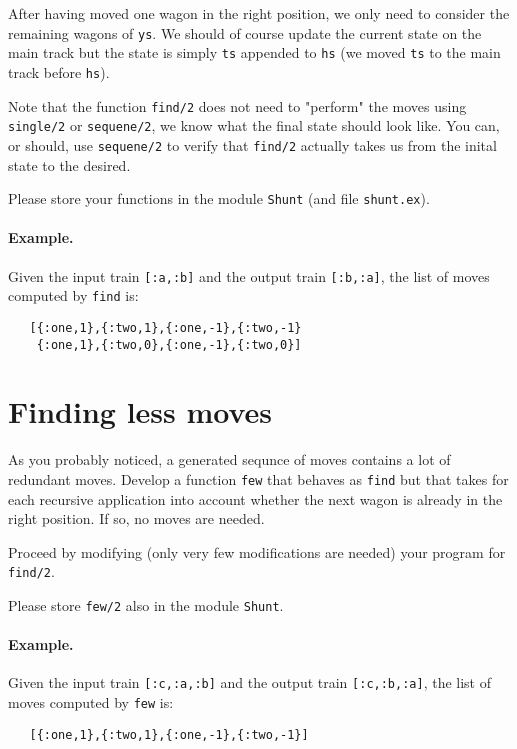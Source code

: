 \documentclass[a4paper,11pt]{article}
\begin{document}
After having moved one wagon in the right position, we only need to
consider the remaining wagons of \verb+ys+. We should of course update
the current state on the main track but the state is simply \verb+ts+
appended to \verb+hs+ (we moved \verb+ts+ to the main track before \verb+hs+).

Note that the function \verb+find/2+ does not need to "perform" the
moves using \verb+single/2+ or \verb+sequene/2+, we know what the
final state should look like. You can, or should, use \verb+sequene/2+
to verify that \verb+find/2+ actually takes us from the inital state
to the desired.

Please store your functions in the module \verb+Shunt+ (and file
\verb+shunt.ex+).

\paragraph{Example.}
Given the input train \verb+[:a,:b]+ and the output train \verb+[:b,:a]+, the
list of moves computed by \verb+find+ is:

\begin{verbatim}
   [{:one,1},{:two,1},{:one,-1},{:two,-1} 
    {:one,1},{:two,0},{:one,-1},{:two,0}]
\end{verbatim}

\section*{Finding less moves}

As you probably noticed, a generated sequnce of moves contains a lot
of redundant moves. Develop a function \verb+few+ that behaves as
\verb+find+ but that takes for each recursive application into account
whether the next wagon is already in the right position. If so, no
moves are needed.

Proceed by modifying (only very few modifications are needed)
your program for \verb+find/2+.

Please store \verb+few/2+ also in the module \verb+Shunt+.

\paragraph{Example.}
Given the input train \verb+[:c,:a,:b]+ and the output train
\verb+[:c,:b,:a]+, the list of moves computed by \verb+few+ is:
\begin{verbatim}
   [{:one,1},{:two,1},{:one,-1},{:two,-1}]
\end{verbatim}
\end{document}
